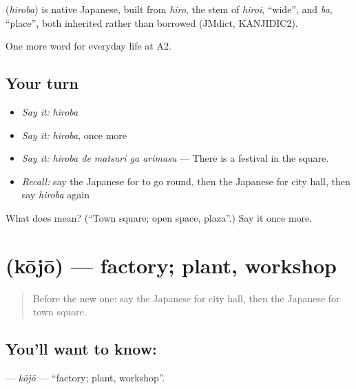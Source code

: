 \begin{cousinweb}
\textbf{} (\emph{hiroba}) is native Japanese, built from \emph{hiro}, the stem of \emph{hiroi}, \textquotedblleft{}wide\textquotedblright{}, and \emph{ba}, \textquotedblleft{}place\textquotedblright{}, both inherited rather than borrowed (JMdict, KANJIDIC2).
\end{cousinweb}

\begin{grammarlens}[title={What you've built}]
One more word for everyday life at A2.
\end{grammarlens}

\subsection*{Your turn}
\begin{itemize}
\raggedright
  \item \emph{Say it:} \emph{hiroba}
  \item \emph{Say it:} \emph{hiroba}, once more
  \item \emph{Say it:} \emph{hiroba de matsuri ga arimasu} — There is a festival in the square.
  \item \emph{Recall:} say the Japanese for to go round, then the Japanese for city hall, then say \emph{hiroba} again
\end{itemize}

\begin{tcolorbox}[breakable,colback=teal!4,colframe=teal!35!black,title={Before you move on}]
What does  mean? (\textquotedblleft{}Town square; open space, plaza\textquotedblright{}.) Say it once more.
\end{tcolorbox}
\section[\texorpdfstring{\ja{こうじょう} (kōjō)}{こうじょう (kōjō)}]{ (kōjō) — factory; plant, workshop}

\label{lesson:JA-C197-koujou}



\begin{quote}
Before the new one: say the Japanese for city hall, then the Japanese for town square.
\end{quote}

\subsection*{You'll want to know: }
\textbf{} — \emph{kōjō} — \textquotedblleft{}factory; plant, workshop\textquotedblright{}.

